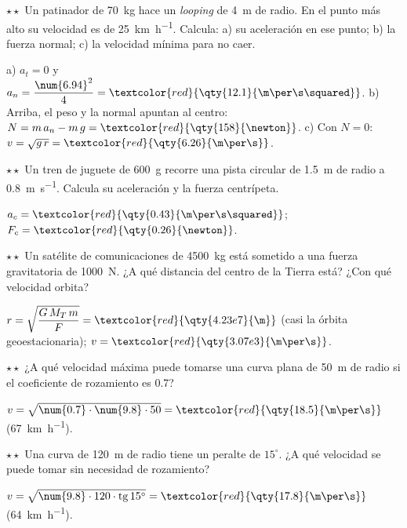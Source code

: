 \begin{exercise}
    \(\star\star\) Un patinador de \qty{70}{\kg} hace un \textit{looping} de \qty{4}{\m} de radio. En el punto más alto su velocidad es de
    \qty{25}{\km\per\hour}. Calcula: a) su aceleración en ese punto; b) la fuerza normal; c) la velocidad mínima para no caer.
    \begin{solu}
        a) \(a_t = 0\) y \(a_n = \dfrac{\num{6.94}^2}{4} = \textcolor{red}{\qty{12.1}{\m\per\s\squared}}\). b) Arriba, el peso y la normal
        apuntan al centro: \(N = m\,a_n - m\,g = \textcolor{red}{\qty{158}{\newton}}\). c) Con \(N = 0\): \(v = \sqrt{g\,r} = \textcolor{red}{\qty{6.26}{\m\per\s}}\).
    \end{solu}
\end{exercise}

\begin{exercise}
    \(\star\star\) Un tren de juguete de \qty{600}{\g} recorre una pista circular de \qty{1.5}{\m} de radio a \qty{0.8}{\m\per\s}. Calcula
    su aceleración y la fuerza centrípeta.
    \begin{solu}
        \(a_c = \textcolor{red}{\qty{0.43}{\m\per\s\squared}}\); \(F_c = \textcolor{red}{\qty{0.26}{\newton}}\).
    \end{solu}
\end{exercise}

\begin{exercise}
    \(\star\star\) Un satélite de comunicaciones de \qty{4500}{\kg} está sometido a una fuerza gravitatoria de \qty{1000}{\newton}. ¿A
    qué distancia del centro de la Tierra está? ¿Con qué velocidad orbita?
    \begin{solu}
        \(r = \sqrt{\dfrac{G\,M_T\,m}{F}} = \textcolor{red}{\qty{4.23e7}{\m}}\) (casi la órbita geoestacionaria); \(v = \textcolor{red}{\qty{3.07e3}{\m\per\s}}\).
    \end{solu}
\end{exercise}

\begin{exercise}
    \(\star\star\) ¿A qué velocidad máxima puede tomarse una curva plana de \qty{50}{\m} de radio si el coeficiente de rozamiento es \num{0.7}?
    \begin{solu}
        \(v = \sqrt{\num{0.7} \cdot \num{9.8} \cdot 50} = \textcolor{red}{\qty{18.5}{\m\per\s}}\) (\qty{67}{\km\per\hour}).
    \end{solu}
\end{exercise}

\begin{exercise}
    \(\star\star\) Una curva de \qty{120}{\m} de radio tiene un peralte de \(15^\circ\). ¿A qué velocidad se puede tomar sin necesidad de
    rozamiento?
    \begin{solu}
        \(v = \sqrt{\num{9.8} \cdot 120 \cdot \tg 15^\circ} = \textcolor{red}{\qty{17.8}{\m\per\s}}\) (\qty{64}{\km\per\hour}).
    \end{solu}
\end{exercise}

